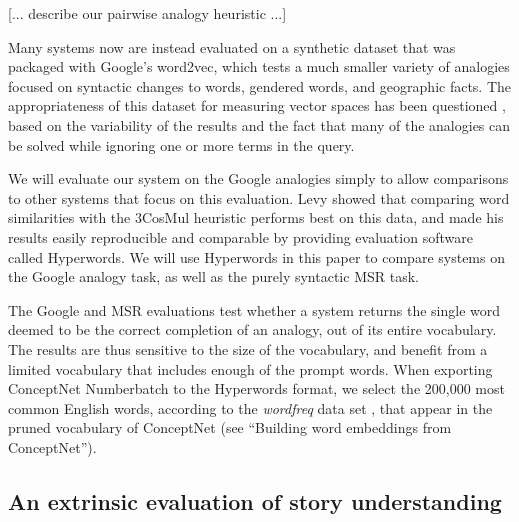 \documentclass[letterpaper]{article}
\begin{document}
[... describe our pairwise analogy heuristic ...]

Many systems now are instead evaluated on a synthetic dataset that was packaged
with Google's word2vec, which tests a much smaller variety of analogies focused
on syntactic changes to words, gendered words, and geographic facts. The
appropriateness of this dataset for measuring vector spaces has been questioned
\cite{linzen2016issues}, based on the variability of the results and the fact
that many of the analogies can be solved while ignoring one or more terms in
the query.

We will evaluate our system on the Google analogies simply to allow comparisons
to other systems that focus on this evaluation. Levy showed that comparing word
similarities with the 3CosMul heuristic \cite{levy2015embeddings} performs best
on this data, and made his results easily reproducible and comparable by
providing evaluation software called Hyperwords. We will use Hyperwords in this
paper to compare systems on the Google analogy task, as well as the purely
syntactic MSR task.

The Google and MSR evaluations test whether a system returns the single word
deemed to be the correct completion of an analogy, out of its entire
vocabulary. The results are thus sensitive to the size of the vocabulary, and
benefit from a limited vocabulary that includes enough of the prompt words.
When exporting ConceptNet Numberbatch to the Hyperwords format, we select the
200,000 most common English words, according to the \emph{wordfreq} data set
\cite{speer2016wordfreq}, that appear in the pruned vocabulary of ConceptNet
(see ``Building word embeddings from ConceptNet'').

\subsection{An extrinsic evaluation of story understanding}
\label{extrinsic-evaluation}


%
\end{document}
